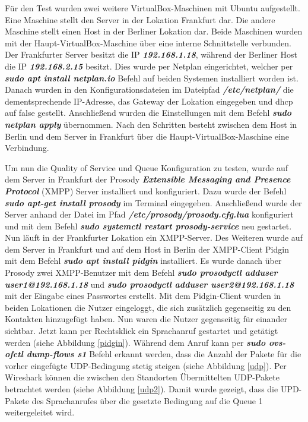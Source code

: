 \documentclass[fontsize=12pt,paper=a4,open=any,parskip=half,
  twoside=false,toc=listof,toc=bibliography,fleqn,leqno,
  captions=nooneline,captions=tableabove,british]{scrbook}
\begin{document}
Für den Test wurden zwei weitere VirtualBox-Maschinen mit Ubuntu aufgestellt. Eine Maschine stellt den Server in der Lokation Frankfurt dar. Die andere Maschine stellt einen Host in der Berliner Lokation dar. Beide Maschinen wurden mit der Haupt-VirtualBox-Maschine über eine interne Schnittstelle verbunden. Der Frankfurter Server besitzt die IP \textit{\textbf{192.168.1.18}}, während der Berliner Host die IP \textit{\textbf{192.168.2.15}} besitzt. Dies wurde per Netplan eingerichtet, welcher per \textit{\textbf{sudo apt install netplan.io}} Befehl auf beiden Systemen installiert worden ist. Danach wurden in den Konfigurationsdateien im Dateipfad \textit{\textbf{/etc/netplan/}} die dementsprechende IP-Adresse, das Gateway der Lokation eingegeben und dhcp auf false gestellt. Anschließend wurden die Einstellungen mit dem Befehl \textit{\textbf{sudo netplan apply}} übernommen. Nach den Schritten besteht zwischen dem Host in Berlin und dem Server in Frankfurt über die Haupt-VirtualBox-Maschine eine Verbindung.\par
Um nun die Quality of Service und Queue Konfiguration zu testen, wurde auf dem Server in Frankfurt der Prosody \textit{\textbf{Extensible Messaging and Presence Protocol}} (XMPP) Server installiert und konfiguriert. Dazu wurde der Befehl \textit{\textbf{sudo apt-get install prosody}} im Terminal eingegeben. Anschließend wurde der Server anhand der Datei im Pfad \textit{\textbf{/etc/prosody/prosody.cfg.lua}} konfiguriert und mit dem Befehl \textit{\textbf{sudo systemctl restart prosody-service}} neu gestartet. Nun läuft in der Frankfurter Lokation ein XMPP-Server. Des Weiteren wurde auf dem Server in Frankfurt und auf dem Host in Berlin der XMPP-Client Pidgin mit dem Befehl \textit{\textbf{sudo apt install pidgin}} installiert. Es wurde danach über Prosody zwei XMPP-Benutzer mit dem Befehl \textit{\textbf{sudo prosodyctl adduser user1@192.168.1.18}} und \textit{\textbf{sudo prosodyctl adduser user2@192.168.1.18}} mit der Eingabe eines Passwortes erstellt. Mit dem Pidgin-Client wurden in beiden Lokationen die Nutzer eingeloggt, die sich zusätzlich gegenseitig zu den Kontakten hinzugefügt haben. Nun waren die Nutzer gegenseitig für einander sichtbar. Jetzt kann per Rechtsklick ein Sprachanruf gestartet und getätigt werden (siehe Abbildung \ref{pidgin}). Während dem Anruf kann per \textit{\textbf{sudo ovs-ofctl dump-flows s1}} Befehl erkannt werden, dass die Anzahl der Pakete für die vorher eingefügte UDP-Bedingung stetig steigen (siehe Abbildung \ref{udp}). Per Wireshark können die zwischen den Standorten Übermittelten UDP-Pakete betrachtet werden (siehe Abbildung \ref{udp2}). Damit wurde gezeigt, dass die UPD-Pakete des Sprachanrufes über die gesetzte Bedingung auf die Queue 1 weitergeleitet wird.
\end{document}
